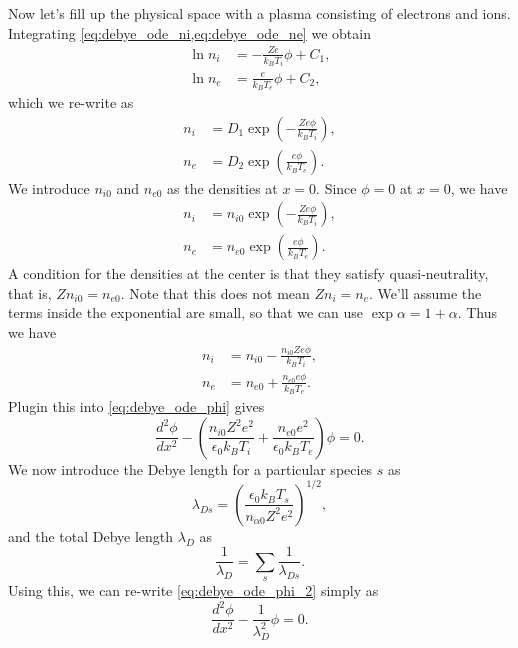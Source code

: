 \documentclass[a4paper,11pt]{report}
\begin{document}
Now let's fill up the physical space with a plasma consisting of electrons and ions. Integrating \cref{eq:debye_ode_ni,eq:debye_ode_ne} we obtain
\begin{align*}
    \ln n_i &= -\frac{Z e}{k_B T_i} \phi + C_1, \\
    \ln n_e &= \frac{e}{k_B T_e} \phi + C_2,
\end{align*}
which we re-write as
\begin{align*}
    n_i &= D_1 \exp \left ( -\frac{Ze\phi}{k_B T_i} \right ), \\
    n_e &= D_2 \exp \left ( \frac{e\phi}{k_B T_e} \right ).
\end{align*}
We introduce $n_{i0}$ and $n_{e0}$ as the densities at $x=0$. Since $\phi = 0$ at $x=0$, we have 
\begin{align*}
    n_i &= n_{i0} \exp \left ( -\frac{Ze\phi}{k_B T_i} \right ), \\
    n_e &= n_{e0} \exp \left ( \frac{e\phi}{k_B T_e} \right ).
\end{align*}
A condition for the densities at the center is that they satisfy quasi-neutrality, that is, $Zn_{i0} = n_{e0}$. Note that this does not mean $Zn_i = n_e$. We'll assume the terms inside the exponential are small, so that we can use $\exp \alpha = 1 + \alpha$. Thus we have
\begin{align*}
    n_i &= n_{i0} - \frac{n_{i0}Ze\phi}{k_B T_i}, \\
    n_e &= n_{e0} + \frac{n_{e0} e\phi}{k_B T_e}.
\end{align*}
Plugin this into \cref{eq:debye_ode_phi} gives
\begin{equation}
    \label{eq:debye_ode_phi_2}
    \frac{d^2\phi}{dx^2} - \left ( \frac{n_{i0}Z^2 e^2}{\epsilon_0 k_B T_i} + \frac{n_{e0}e^2}{\epsilon_0 k_B T_e}\right ) \phi = 0.
\end{equation}
We now introduce the Debye length for a particular species $s$ as
\begin{equation}
    \label{eq:debye_def}
    \lambda_{Ds} = \left ( \frac{\epsilon_0 k_B T_s}{n_{\alpha0} Z^2 e^2} \right )^{1/2},
\end{equation}
and the total Debye length $\lambda_D$ as
\begin{equation}
    \frac{1}{\lambda_D} = \sum_s \frac{1}{\lambda_{Ds}}.
\end{equation}
Using this, we can re-write \cref{eq:debye_ode_phi_2} simply as
\begin{equation}
    \frac{d^2 \phi}{dx^2} - \frac{1}{\lambda_D^2} \phi = 0.
\end{equation}
\end{document}
